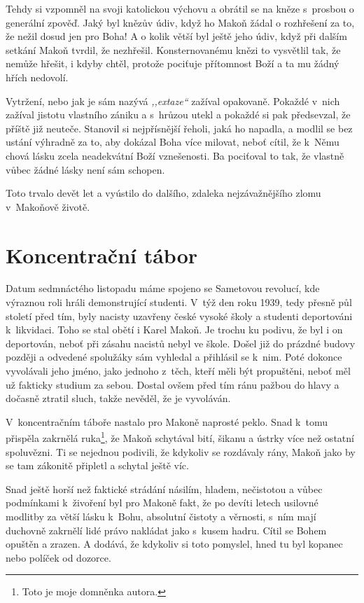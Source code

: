 Tehdy si vzpomněl na svoji katolickou výchovu a obrátil se na kněze s~prosbou o
generální zpověď. Jaký byl knězův údiv, když ho Makoň žádal o rozhřešení za to,
že nežil dosud jen pro Boha! A o kolik větší byl ještě jeho údiv, když při
dalším setkání Makoň tvrdil, že nezhřešil. Konsternovanému knězi to vysvětlil
tak, že nemůže hřešit, i kdyby chtěl, protože pociťuje přítomnost Boží a ta mu
žádný hřích nedovolí.

Vytržení, nebo jak je sám nazývá \textit{,,extaze``} zažíval opakovaně. Pokaždé
v~nich zažíval jistotu vlastního zániku a s~hrůzou utekl a pokaždé si pak
předsevzal, že příště již neuteče. Stanovil si nejpřísnější řeholi, jaká ho
napadla, a modlil se bez ustání výhradně za to, aby dokázal Boha více milovat,
neboť cítil, že k~Němu chová lásku zcela neadekvátní Boží vznešenosti. Ba
pociťoval to tak, že vlastně vůbec žádné lásky není sám schopen.

Toto trvalo devět let a vyústilo do dalšího, zdaleka nejzávažnějšího zlomu
v~Makoňově životě.

\section{Koncentrační tábor}

Datum sedmnáctého listopadu máme spojeno se Sametovou revolucí, kde výraznou
roli hráli demonstrující studenti. V~týž den roku 1939, tedy
přesně půl století před tím, byly nacisty uzavřeny české vysoké školy a studenti
deportováni k~likvidaci. Toho se stal obětí i Karel Makoň. Je trochu ku podivu,
že byl i on deportován, neboť při zásahu nacistů nebyl ve škole. Došel již do
prázdné budovy později a odvedené spolužáky sám vyhledal a přihlásil se k~nim.
Poté dokonce vyvolávali jeho jméno, jako jednoho z~těch, kteří měli být
propuštěni, neboť měl už fakticky studium za sebou. Dostal ovšem před tím ránu
pažbou do hlavy a dočasně ztratil sluch, takže nevěděl, že je vyvoláván.

V~koncentračním táboře nastalo pro Makoně naprosté peklo. Snad k~tomu přispěla
zakrnělá ruka\footnote{Toto je moje domněnka autora.}, že Makoň schytával bití,
šikanu a ústrky více než ostatní spoluvězni. Ti se nejednou podivili, že
kdykoliv se rozdávaly rány, Makoň jako by se tam zákonitě připletl a schytal
ještě víc.

Snad ještě horší než faktické strádání násilím, hladem, nečistotou a vůbec
podmínkami k~živoření byl pro Makoně fakt, že po devíti letech usilovné modlitby
za větší lásku k~Bohu, absolutní čistoty a věrnosti, s~ním mají duchovně
zakrnělí lidé právo nakládat jako s~kusem hadru. Cítil se Bohem opuštěn a
zrazen. A dodává, že kdykoliv si toto pomyslel, hned tu byl kopanec nebo políček
od dozorce.

